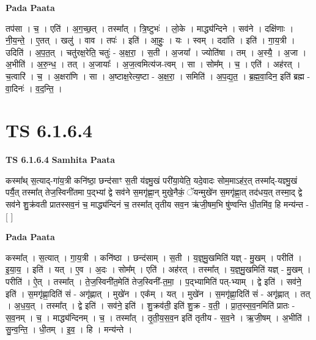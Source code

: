 \documentclass[17pt]{extarticle}
\begin{document}
\textbf{Pada Paata} \newline

तप॑सा । च॒ । एति॑ । अ॒ग॒च्छ॒त् । तस्मा᳚त् । त्रि॒ष्टुभः॑ । लो॒के । माद्ध्य॑न्दिने । सव॑ने । दक्षि॑णाः । नी॒य॒न्ते॒ । ए॒तत् । खलु॑ । वाव । तपः॑ । इति॑ । आ॒हुः॒ । यः । स्वम् । ददा॑ति । इति॑ । गा॒य॒त्री । उदिति॑ । अ॒प॒त॒त् । चतु॑रक्ष॒रेति॒ चतुः॑ - अ॒क्ष॒रा॒ । स॒ती । अ॒जया᳚ । ज्योति॑षा । तम् । अ॒स्यै॒ । अ॒जा । अ॒भीति॑ । अ॒रु॒न्ध॒ । तत् । अ॒जायाः᳚ । अ॒ज॒त्वमित्य॑ज-त्वम् । सा । सोम᳚म् । च॒ । एति॑ । अह॑रत् । च॒त्वारि॑ । च॒ । अ॒क्षरा॑णि । सा । अ॒ष्टाक्ष॒रेत्य॒ष्टा - अ॒क्ष॒रा॒ । समिति॑ । अ॒प॒द्य॒त॒ । ब्र॒ह्म॒वा॒दिन॒ इति॑ ब्रह्म - वा॒दिनः॑ । व॒द॒न्ति॒ ।  \newline





\section{ TS 6.1.6.4 }

\textbf{TS 6.1.6.4 } \newline
\textbf{Samhita Paata} \newline

कस्मा᳚थ् स॒त्याद्-गा॑य॒त्री कनि॑ष्ठा॒ छन्द॑साꣳ स॒ती य॑ज्ञ्मु॒खं परी॑या॒येति॒ यदे॒वादः सोम॒माऽह॑र॒त् तस्मा᳚द्-यज्ञ्मु॒खं पर्यै॒त् तस्मा᳚त् तेज॒स्विनी॑तमा प॒द्भ्यां द्वे सव॑ने स॒मगृ॑ह्णा॒न् मुखे॒नैकं॒ ॅयन्मुखे॑न स॒मगृ॑ह्णा॒त् तद॑धय॒त् तस्मा॒द् द्वे सव॑ने शु॒क्र॑वती प्रातस्सव॒नं च॒ माद्ध्य॑न्दिनं च॒ तस्मा᳚त् तृतीय सव॒न ऋ॑जी॒षम॒भि षु॑ण्वन्ति धी॒तमि॑व॒ हि मन्य॑न्त - [  ] \newline

\textbf{Pada Paata} \newline

कस्मा᳚त् । स॒त्यात् । गा॒य॒त्री । कनि॑ष्ठा । छन्द॑साम् । स॒ती । य॒ज्ञ्॒मु॒खमिति॑ यज्ञ् - मु॒खम् । परीति॑ । इ॒या॒य॒ । इति॑ । यत् । ए॒व । अ॒दः । सोम᳚म् । एति॑ । अह॑रत् । तस्मा᳚त् । य॒ज्ञ्॒मु॒खमिति॑ यज्ञ् - मु॒खम् । परीति॑ । ऐ॒त् । तस्मा᳚त् । ते॒ज॒स्विनी॑त॒मेति॑ तेज॒स्विनी᳚-त॒मा॒ । प॒द्भ्यामिति॑ पत्-भ्याम् । द्वे इति॑ । सव॑ने॒ इति॑ । स॒मगृ॑ह्णा॒दिति॑ सं - अगृ॑ह्णात् । मुखे॑न । एक᳚म् । यत् । मुखे॑न । स॒मगृ॑ह्णा॒दिति॑ सं - अगृ॑ह्णात् । तत् । अ॒ध॒य॒त् । तस्मा᳚त् । द्वे इति॑ । सव॑ने॒ इति॑ । शु॒क्रव॑ती॒ इति॑ शु॒क्र - व॒ती॒ । प्रा॒त॒स्स॒व॒नमिति॑ प्रातः - स॒व॒नम् । च॒ । माद्ध्य॑न्दिनम् । च॒ । तस्मा᳚त् । तृ॒ती॒य॒स॒व॒न इति॑ तृतीय - स॒व॒ने । ऋ॒जी॒षम् । अ॒भीति॑ । सु॒न्व॒न्ति॒ । धी॒तम् । इ॒व॒ । हि । मन्य॑न्ते ।  \newline
\end{document}
